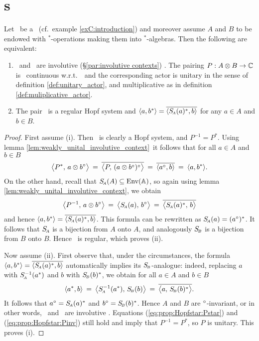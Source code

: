 \section{\Hss s}


\begin{prop_sec} \label{prop:Hopf_star_system}
Let\/ \pairAB\ be a \dpa\ (cf.\ example \ref{exC:introduction}) and moreover assume
$A$ and\/ $B$ to be endowed with $^*$-operations making them into $^*$-algebras.
Then the following are equivalent:
\begin{enumerate}
\item
\Aa\ and\/ \BB\ are involutive {\rm(\S \ref{par:involutive contexts})} \contexts\@.
The pairing\/ $P: A \otimes B \rightarrow \mathbb{C}$ is \stricta\ continuous w.r.t.\ \BBAA\
and the corresponding actor is unitary in the sense of definition \ref{def:unitary_actor},
and multiplicative as in definition \ref{def:muliplicative_actor}\@.
\item
The pair \pairAB\ is a regular Hopf system and $\langle a,b^* \rangle = \overline{\langle S_{\scriptscriptstyle \! A}(a)^*,b \rangle}$
for any\/ $a \in A$ and\/ $b \in B$.
\end{enumerate}
\end{prop_sec}

\begin{proof}
First assume (i).
Then \pairAB\ is clearly a Hopf system, and $P^{-1}=P^*$.
Using lemma \ref{lem:weakly_unital_involutive_context}\ it follows that
for all $a \in A$ and $b \in B$
\begin{equation}\label{eq:prop:Hopfstar:Pstar}
\pairM{P^*}{a \tens b\conj}
     \:=\:  \overline{\pairM{P}{(a \tens b\conj)\conj}}
     \:=\:  \overline{\pair{a\conj}{b}}
     \:=\:  \pair{a}{b^*}.
\end{equation}
On the other hand, recall that $S_{\scriptscriptstyle \! A}(A)\subseteq \mbox{\rm Env}(\mathbb{A})$,
so again using lemma \ref{lem:weakly_unital_involutive_context}, we obtain
\begin{equation}\label{eq:prop:Hopfstar:Pinv}
\pairM{P^{-1}}{a \tens b\conj}
     \:=\:  \pairM{\SA(a)}{b\conj}
     \:=\:  \overline{\pairM{\SA(a)^*}{b}}
\end{equation}
and hence $\langle a,b^* \rangle = \overline{\langle S_{\scriptscriptstyle \! A}(a)^*,b \rangle}$.
This formula can be rewritten as $S_{\scriptscriptstyle \! A}(a)=(a^\circ)^*$.
It follows that $S_{\scriptscriptstyle \! A}$ is a bijection from $A$ onto $A$,
and analogously $S_{\scriptscriptstyle \! B}$ is a bijection from $B$ onto $B$.
Hence \pairAB\ is regular, which proves (ii).

Now assume (ii).
First observe that, under the circumstances, the formula
$\langle a,b^* \rangle = \overline{\langle S_{\scriptscriptstyle \! A}(a)^*,b \rangle}$
automatically implies its $S_{\scriptscriptstyle \! B}$-analogue:
indeed, replacing $a$ with $S_{\scriptscriptstyle \! A}^{-1}(a^*)$ and $b$ with $S_{\scriptscriptstyle \! B}(b)^*$,
we obtain for all $a \in A$ and $b \in B$
$$  \pair{a^*}{b}
      \:=\:  \pairM{\SA^{-1}(a^*)}{\SB(b)}
      \:=\:  \overline{\pairM{a}{\SB(b)^*}}. $$
It follows that $a^\circ = S_{\scriptscriptstyle \! A}(a)^*$ and $b^\circ = S_{\scriptscriptstyle \! B}(b)^*$.
Hence $A$ and $B$ are $^\circ$-invariant, or in other words, \Aa\ and \BB\ are
involutive \contexts\@.
Equations (\ref{eq:prop:Hopfstar:Pstar}) and (\ref{eq:prop:Hopfstar:Pinv}) still hold
and imply that $P^{-1} = P^*$, so $P$ is unitary. This proves (i).
\end{proof}



